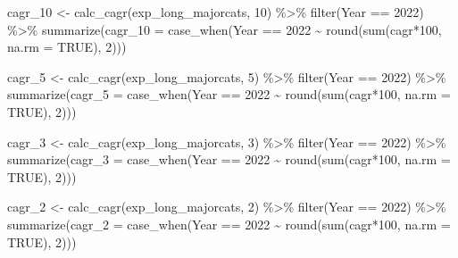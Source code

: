 \documentclass[
  letterpaper,
  DIV=11,
  numbers=noendperiod]{scrreport}
\newenvironment{Shaded}{\begin{snugshade}}{\end{snugshade}}
\newcommand{\AttributeTok}[1]{\textcolor[rgb]{0.40,0.45,0.13}{#1}}
\newcommand{\ConstantTok}[1]{\textcolor[rgb]{0.56,0.35,0.01}{#1}}
\newcommand{\DecValTok}[1]{\textcolor[rgb]{0.68,0.00,0.00}{#1}}
\newcommand{\FunctionTok}[1]{\textcolor[rgb]{0.28,0.35,0.67}{#1}}
\newcommand{\NormalTok}[1]{\textcolor[rgb]{0.00,0.23,0.31}{#1}}
\newcommand{\OtherTok}[1]{\textcolor[rgb]{0.00,0.23,0.31}{#1}}
\newcommand{\SpecialCharTok}[1]{\textcolor[rgb]{0.37,0.37,0.37}{#1}}
\begin{document}
\begin{Shaded}
\begin{Highlighting}[]
\NormalTok{cagr\_10 }\OtherTok{\textless{}{-}} \FunctionTok{calc\_cagr}\NormalTok{(exp\_long\_majorcats, }\DecValTok{10}\NormalTok{) }\SpecialCharTok{\%\textgreater{}\%} 
  \FunctionTok{filter}\NormalTok{(Year }\SpecialCharTok{==} \DecValTok{2022}\NormalTok{) }\SpecialCharTok{\%\textgreater{}\%}
  \FunctionTok{summarize}\NormalTok{(}\AttributeTok{cagr\_10 =} \FunctionTok{case\_when}\NormalTok{(Year }\SpecialCharTok{==} \DecValTok{2022} \SpecialCharTok{\textasciitilde{}} \FunctionTok{round}\NormalTok{(}\FunctionTok{sum}\NormalTok{(cagr}\SpecialCharTok{*}\DecValTok{100}\NormalTok{, }\AttributeTok{na.rm =} \ConstantTok{TRUE}\NormalTok{), }\DecValTok{2}\NormalTok{)))}

\NormalTok{cagr\_5 }\OtherTok{\textless{}{-}} \FunctionTok{calc\_cagr}\NormalTok{(exp\_long\_majorcats, }\DecValTok{5}\NormalTok{) }\SpecialCharTok{\%\textgreater{}\%} 
  \FunctionTok{filter}\NormalTok{(Year }\SpecialCharTok{==} \DecValTok{2022}\NormalTok{) }\SpecialCharTok{\%\textgreater{}\%}
  \FunctionTok{summarize}\NormalTok{(}\AttributeTok{cagr\_5 =} \FunctionTok{case\_when}\NormalTok{(Year }\SpecialCharTok{==} \DecValTok{2022} \SpecialCharTok{\textasciitilde{}} \FunctionTok{round}\NormalTok{(}\FunctionTok{sum}\NormalTok{(cagr}\SpecialCharTok{*}\DecValTok{100}\NormalTok{, }\AttributeTok{na.rm =} \ConstantTok{TRUE}\NormalTok{), }\DecValTok{2}\NormalTok{)))}

\NormalTok{cagr\_3 }\OtherTok{\textless{}{-}} \FunctionTok{calc\_cagr}\NormalTok{(exp\_long\_majorcats, }\DecValTok{3}\NormalTok{) }\SpecialCharTok{\%\textgreater{}\%} 
  \FunctionTok{filter}\NormalTok{(Year }\SpecialCharTok{==} \DecValTok{2022}\NormalTok{) }\SpecialCharTok{\%\textgreater{}\%}
  \FunctionTok{summarize}\NormalTok{(}\AttributeTok{cagr\_3 =} \FunctionTok{case\_when}\NormalTok{(Year }\SpecialCharTok{==} \DecValTok{2022} \SpecialCharTok{\textasciitilde{}} \FunctionTok{round}\NormalTok{(}\FunctionTok{sum}\NormalTok{(cagr}\SpecialCharTok{*}\DecValTok{100}\NormalTok{, }\AttributeTok{na.rm =} \ConstantTok{TRUE}\NormalTok{), }\DecValTok{2}\NormalTok{)))}

\NormalTok{cagr\_2 }\OtherTok{\textless{}{-}} \FunctionTok{calc\_cagr}\NormalTok{(exp\_long\_majorcats, }\DecValTok{2}\NormalTok{) }\SpecialCharTok{\%\textgreater{}\%} 
  \FunctionTok{filter}\NormalTok{(Year }\SpecialCharTok{==} \DecValTok{2022}\NormalTok{) }\SpecialCharTok{\%\textgreater{}\%}
  \FunctionTok{summarize}\NormalTok{(}\AttributeTok{cagr\_2 =} \FunctionTok{case\_when}\NormalTok{(Year }\SpecialCharTok{==} \DecValTok{2022} \SpecialCharTok{\textasciitilde{}} \FunctionTok{round}\NormalTok{(}\FunctionTok{sum}\NormalTok{(cagr}\SpecialCharTok{*}\DecValTok{100}\NormalTok{, }\AttributeTok{na.rm =} \ConstantTok{TRUE}\NormalTok{), }\DecValTok{2}\NormalTok{)))}


\end{Highlighting}
\end{Shaded}
\end{document}
